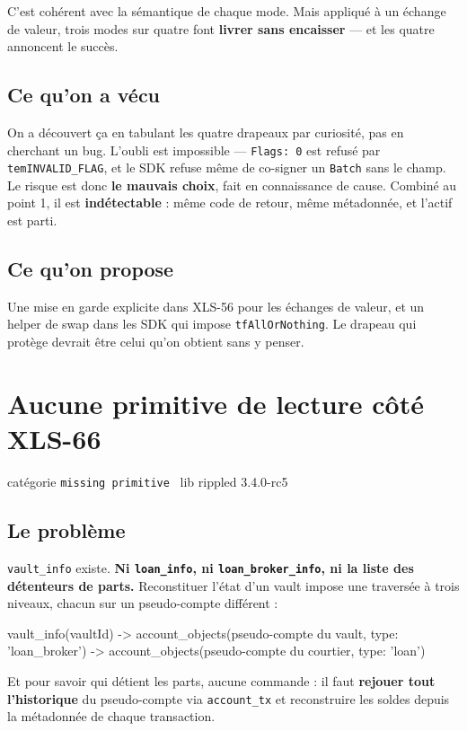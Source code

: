 \documentclass[10pt,a4paper]{article}
\newcommand{\cat}[2]{{\small\textsf{catégorie} \texttt{#1} \textperiodcentered\ \textsf{lib} #2}\par\vspace{2pt}}
\newcommand{\tc}[1]{\texttt{#1}}
\begin{document}
C'est cohérent avec la sémantique de chaque mode. Mais appliqué à un échange de valeur, trois
modes sur quatre font \textbf{livrer sans encaisser} --- et les quatre annoncent le succès.

\subsection{Ce qu'on a vécu}
On a découvert ça en tabulant les quatre drapeaux par curiosité, pas en cherchant un bug.
L'oubli est impossible --- \tc{Flags: 0} est refusé par \tc{temINVALID\_FLAG}, et le SDK refuse
même de co-signer un \tc{Batch} sans le champ. Le risque est donc \textbf{le mauvais choix},
fait en connaissance de cause. Combiné au point 1, il est \textbf{indétectable} : même code de
retour, même métadonnée, et l'actif est parti.

\subsection{Ce qu'on propose}
Une mise en garde explicite dans XLS-56 pour les échanges de valeur, et un helper de swap dans
les SDK qui impose \tc{tfAllOrNothing}. Le drapeau qui protège devrait être celui qu'on obtient
sans y penser.

\section{Aucune primitive de lecture côté XLS-66}
\cat{missing primitive}{rippled 3.4.0-rc5}

\subsection{Le problème}
\tc{vault\_info} existe. \textbf{Ni \tc{loan\_info}, ni \tc{loan\_broker\_info}, ni la liste des
détenteurs de parts.} Reconstituer l'état d'un vault impose une traversée à trois niveaux,
chacun sur un pseudo-compte différent :

\begin{code}
vault_info(vaultId)
  -> account_objects(pseudo-compte du vault,      type: 'loan_broker')
    -> account_objects(pseudo-compte du courtier, type: 'loan')
\end{code}

Et pour savoir qui détient les parts, aucune commande : il faut \textbf{rejouer tout
l'historique} du pseudo-compte via \tc{account\_tx} et reconstruire les soldes depuis la
métadonnée de chaque transaction.
\end{document}
